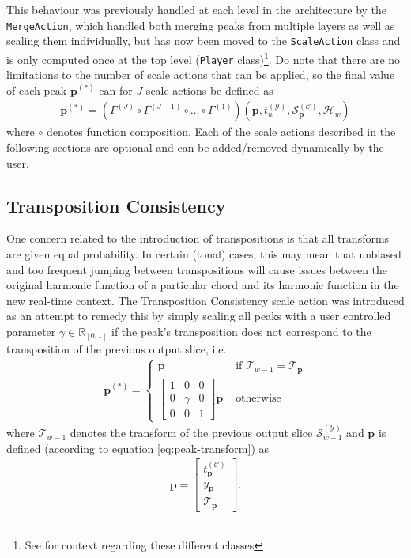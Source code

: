 	
This behaviour was previously handled at each level in the architecture by the \texttt{MergeAction}, which handled both merging peaks from multiple layers as well as scaling them individually, but has now been moved to the \texttt{ScaleAction} class and is only computed once at the top level (\texttt{Player} class)\footnote{See \cite{somaxsoftware2021} for context regarding these different classes}. Do note that there are no limitations to the number of scale actions that can be applied, so the final value of each peak $\bm  p^{(\ast)}$ can for $J$ scale actions be defined as
	\begin{align}
		\bm p^{(\ast)} = \left(\Gamma^{(J)} \circ \Gamma^{(J-1)} \circ \dots \circ \Gamma^{(1)} \right)\left(\bm p, t^{(\mathcal Y)}_w, \mathcal S^{(\mathcal C)}_{\bm p}, \mathcal H_w\right)
	\end{align}
	where $\circ$ denotes function composition. Each of the scale actions described in the following sections are optional and can be added/removed dynamically by the user.

\subsection{Transposition Consistency}
One concern related to the introduction of transpositions is that all transforms are given equal probability. In certain (tonal) cases, this may mean that unbiased and too frequent jumping between transpositions will cause issues between the original harmonic function of a particular chord and its harmonic function in the new real-time context. The Transposition Consistency scale action was introduced as an attempt to remedy this by simply scaling all peaks with a user controlled parameter $\gamma \in \mathbb R_{[0, 1]}$ if the peak's transposition does not correspond to the transposition of the previous output slice, i.e.
	\begin{align}
		\bm p^{(\ast)} = \left\lbrace\begin{array}{cl}
				\bm p & \text{ if } \mathcal T_{w-1} = \mathcal T_{\bm p}\\
				\begin{bmatrix} 
					1 & 0 & 0 \\
					0 & \gamma & 0\\
					0 & 0 & 1
				\end{bmatrix} \bm p & \text{ otherwise}
			\end{array}\right.
	\end{align}
	where $\mathcal T_{w-1}$ denotes the transform of the previous output slice $\mathcal S^{(\mathcal Y)}_{w-1}$ and $\bm p$ is defined (according to equation \ref{eq:peak-transform}) as
	\begin{align}
		\bm p = \begin{bmatrix} 
			t^{(\mathcal C)}_{\bm p} \\ y_{\bm p} \\ \mathcal T_{\bm p} 
		\end{bmatrix}.
	\end{align}


